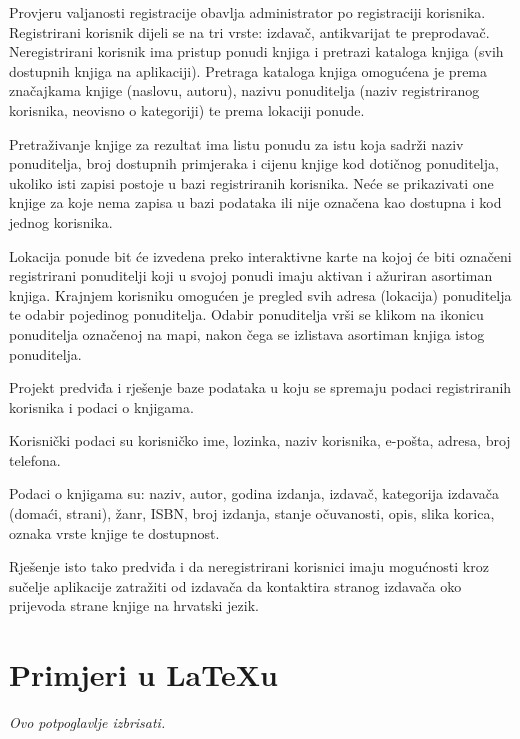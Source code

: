 		Provjeru valjanosti registracije obavlja administrator po registraciji korisnika.
		Registrirani korisnik dijeli se na tri vrste: izdavač, antikvarijat te preprodavač.
		Neregistrirani korisnik ima pristup ponudi knjiga i  pretrazi kataloga knjiga (svih dostupnih knjiga na aplikaciji). Pretraga kataloga knjiga omogućena je prema značajkama knjige (naslovu, autoru), nazivu ponuditelja (naziv registriranog korisnika, neovisno o kategoriji) te prema lokaciji ponude. 
		
		Pretraživanje knjige za rezultat ima listu ponudu za istu koja sadrži naziv ponuditelja, broj dostupnih	primjeraka i cijenu knjige kod dotičnog ponuditelja, ukoliko isti zapisi postoje u bazi registriranih korisnika. Neće se prikazivati one knjige  za koje nema zapisa u bazi podataka  ili nije označena kao dostupna i kod jednog  korisnika.
		
		Lokacija ponude bit će izvedena preko interaktivne karte na kojoj će biti označeni registrirani ponuditelji koji u svojoj ponudi imaju aktivan i ažuriran asortiman knjiga. Krajnjem korisniku omogućen je pregled svih adresa  (lokacija) ponuditelja te odabir pojedinog ponuditelja. Odabir ponuditelja vrši se klikom na ikonicu ponuditelja označenoj na mapi, nakon čega se izlistava asortiman knjiga istog ponuditelja.
		
		Projekt predviđa i rješenje baze podataka u koju se spremaju podaci registriranih korisnika i podaci o knjigama.
		
		Korisnički podaci su korisničko ime, lozinka, naziv korisnika,  e-pošta, adresa, broj telefona.
		
		Podaci o knjigama su: naziv, autor, godina izdanja, izdavač, kategorija izdavača (domaći, strani), žanr, ISBN, broj izdanja, stanje očuvanosti, opis, slika korica, oznaka vrste knjige te dostupnost.
		
		Rješenje isto tako predviđa i da neregistrirani korisnici imaju mogućnosti  kroz sučelje aplikacije zatražiti od izdavača da kontaktira stranog izdavača oko prijevoda strane knjige na hrvatski jezik. 
		
		
		
		\section{Primjeri u \LaTeX u}
		
		\textit{Ovo potpoglavlje izbrisati.}\\


